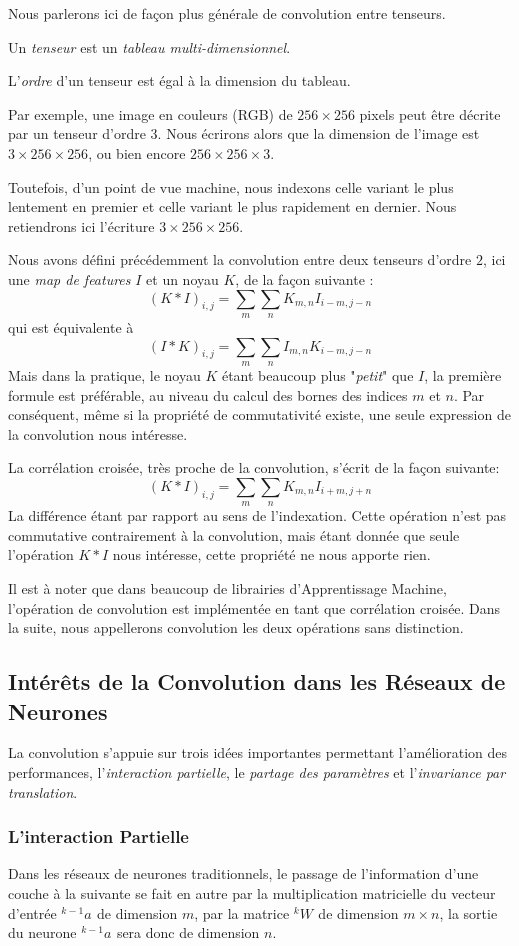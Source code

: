 \documentclass[a4paper, 11pt]{report}
\newcommand{\lexp}[1]{\phantom{}^{#1}}
\newcommand{\elem}[4]{\lexp{#2}#1^{#3}_{#4}}
\begin{document}
Nous parlerons ici de façon plus générale de convolution entre tenseurs.
\begin{center}
	Un \emph{tenseur} est un \emph{tableau multi-dimensionnel}.
	
	L'\emph{ordre} d'un tenseur est égal à la dimension du tableau.
\end{center}
Par exemple, une image en couleurs (RGB) de $256 \times 256$ pixels peut être décrite par un tenseur d'ordre $3$.
Nous écrirons alors que la dimension de l'image est $3 \times 256 \times 256$, ou bien encore $256 \times 256 \times 3$.

Toutefois, d'un point de vue machine, nous indexons celle variant le plus lentement en premier et celle variant le plus rapidement en dernier. Nous retiendrons ici l'écriture $3 \times 256 \times 256$.

Nous avons défini précédemment la convolution entre deux tenseurs d'ordre $2$, ici une \emph{map de features} $I$ et un noyau $K$, de la façon suivante :
$$(K*I)_{i,j} = \sum_{m}\sum_{n}{K_{m,n}I_{i-m,j-n}}$$
qui est équivalente à 
$$(I*K)_{i,j} = \sum_{m}\sum_{n}{I_{m,n}K_{i-m,j-n}}$$
Mais dans la pratique, le noyau $K$ étant beaucoup plus "\emph{petit}" que $I$, la première formule est préférable, au niveau du calcul des bornes des indices $m$ et $n$.
Par conséquent, même si la propriété de commutativité existe, une seule expression de la convolution nous intéresse.

La corrélation croisée, très proche de la convolution, s'écrit de la façon suivante:
$$(K*I)_{i,j} = \sum_{m}\sum_{n}{K_{m,n}I_{i+m,j+n}}$$
La différence étant par rapport au sens de l'indexation. Cette opération n'est pas commutative contrairement à la convolution, mais étant donnée que seule l'opération $K*I$ nous intéresse, cette propriété ne nous apporte rien.

Il est à noter que dans beaucoup de librairies d'Apprentissage Machine, l'opération de convolution est implémentée en tant que corrélation croisée. Dans la suite, nous appellerons convolution les deux opérations sans distinction.
			
\subsection{Intérêts de la Convolution dans les Réseaux de Neurones}
La convolution s'appuie sur trois idées importantes permettant l'amélioration des performances, l'\emph{interaction partielle}, le \emph{partage des paramètres} et l'\emph{invariance par translation}.
\subsubsection{L'interaction Partielle}
Dans les réseaux de neurones traditionnels, le passage de l'information d'une couche à la suivante se fait en autre par la multiplication matricielle du vecteur d'entrée $\elem{a}{k-1}{}{}$ de dimension $m$, par la matrice $\elem{W}{k}{}{}$ de dimension $m \times n$, la sortie du neurone $\elem{a}{k-1}{}{}$ sera donc de dimension $n$.
\end{document}
